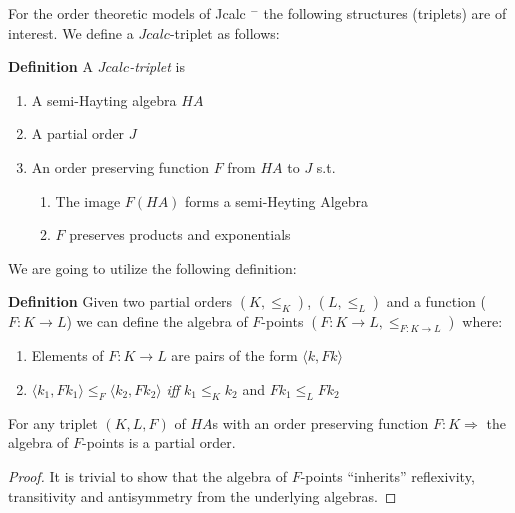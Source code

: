 			For the order theoretic models of  Jcalc $^{-}$ the following structures (triplets) 
			are of interest. We define a $Jcalc$-triplet as follows:
			\begin{mdframed}
				\textbf{Definition}
			A \emph{$Jcalc$-triplet} is 
				
			\begin{enumerate}
			\item A semi-Hayting algebra $HA$
			\item A partial order $J$
			\item An order preserving function $F$ from $HA$ to $J$ s.t.
			\begin{enumerate}
				\item The image $F(HA)$ forms a semi-Heyting Algebra
				\item $F$ preserves products and exponentials
			\end{enumerate}
			\end{enumerate}
			\end{mdframed}
			We are going to utilize the following definition: 
			\begin{mdframed}
				\textbf{Definition}
				Given two partial orders $(K,\le_{K})$, $(L,\le_{L})$ and a function ($F: K\rightarrow L$) 
				we can define the algebra of $F$-points  $(F:K \rightarrow L,\le_{F:K\rightarrow L})$
				where:
				\begin{enumerate}
					\item Elements of $F:K\rightarrow L$ are  pairs of the form $\langle k,Fk \rangle$
					\item $\langle k_1,Fk_1 \rangle \le_F \langle k_2, Fk_2\rangle$ \textit{iff}  $k_1\le_{K}k_2$ and $Fk_1\le_{L}Fk_2$ 
				\end{enumerate}
			\end{mdframed}

			\begin{theorem}
				For any triplet $(K,L,F)$ of $HA$s with an order preserving function $F:K\Rightarrow$
				the algebra of $F$-points is a partial order.
			\end{theorem}
			\begin{proof}
				It is trivial to show that the algebra of $F$-points ``inherits'' reflexivity, 
				transitivity and antisymmetry from the underlying algebras.
			\end{proof}

